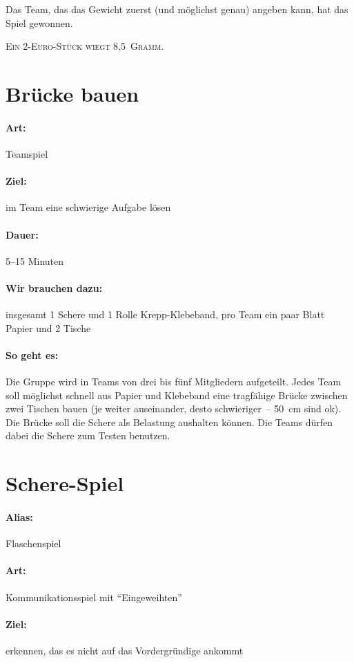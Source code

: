 Das Team, das das Gewicht zuerst (und möglichst genau) angeben kann, hat das Spiel gewonnen.

 \textsc{Ein 2-Euro-Stück wiegt 8,5~Gramm.}

\section{Brücke bauen}
\paragraph{Art:} Teamspiel
\paragraph{Ziel:} im Team eine schwierige Aufgabe lösen
\paragraph{Dauer:} 5--15 Minuten
\paragraph{Wir brauchen dazu:} insgesamt 1 Schere und 1 Rolle Krepp-Klebeband, pro Team ein paar Blatt Papier und 2 Tische
\paragraph{So geht es:} Die Gruppe wird in Teams von drei bis fünf Mitgliedern aufgeteilt. Jedes Team soll möglichst schnell aus Papier und Klebeband eine tragfähige Brücke zwischen zwei Tischen bauen (je weiter auseinander, desto schwieriger~-- 50~cm sind ok). Die Brücke soll die Schere als Belastung aushalten können. Die Teams dürfen dabei die Schere zum Testen benutzen.

\section{Schere-Spiel}
\label{flaschenspiel}
\paragraph{Alias:} Flaschenspiel
\paragraph{Art:} Kommunikationsspiel mit "`Eingeweihten"'
\paragraph{Ziel:} erkennen, das es nicht auf das Vordergründige ankommt
